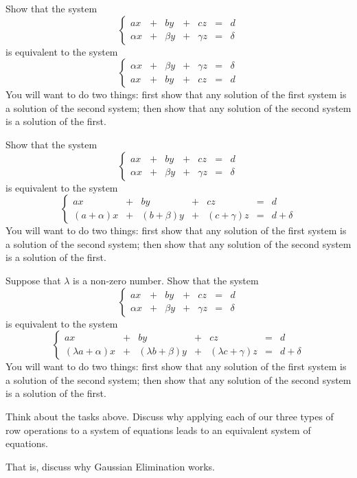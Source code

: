 \documentclass[cahier-main.tex]{subfiles}
\begin{document}
\begin{task}
Show that the system
\[
\left\{
\begin{array}{rrrrrrr}
ax &+& by &+& cz &=& d \\
\alpha x &+& \beta y &+& \gamma z &=& \delta
\end{array}
\right.
\]
is equivalent to the system
\[
\left\{
\begin{array}{rrrrrrr}
\alpha x &+& \beta y &+& \gamma z &=& \delta \\
ax &+& by &+& cz &=& d 
\end{array}
\right.
\]
You will want to do two things: first show that any solution of the first system is a solution of the second system; then show that any solution of the second system is a solution of the first.
\end{task}


\begin{task}
Show that the system
\[
\left\{
\begin{array}{rrrrrrr}
ax &+& by &+& cz &=& d \\
\alpha x &+& \beta y &+& \gamma z &=& \delta
\end{array}
\right.
\]
is equivalent to the system
\[
\left\{
\begin{array}{rrrrrrr}
ax &+& by &+& cz &=& d \\
(a+\alpha) x &+& (b+\beta) y &+& (c+\gamma) z &=& d+\delta
\end{array}
\right.
\]
You will want to do two things: first show that any solution of the first system is a solution of the second system; then show that any solution of the second system is a solution of the first.
\end{task}


\begin{task}
Suppose that $\lambda$ is a non-zero number. Show that the system
\[
\left\{
\begin{array}{rrrrrrr}
ax &+& by &+& cz &=& d \\
\alpha x &+& \beta y &+& \gamma z &=& \delta
\end{array}
\right.
\]
is equivalent to the system
\[
\left\{
\begin{array}{rrrrrrr}
ax &+& by &+& cz &=& d \\
(\lambda a+\alpha) x &+& (\lambda b+\beta) y &+& (\lambda c+\gamma) z &=& d+\delta
\end{array}
\right.
\]
You will want to do two things: first show that any solution of the first system is a solution of the second system; then show that any solution of the second system is a solution of the first.
\end{task}

\begin{task}
Think about the tasks above. Discuss why applying each of our three types of row operations to a system of equations leads to an equivalent system of equations.

That is, discuss why Gaussian Elimination works.
\end{task}
\end{document}
